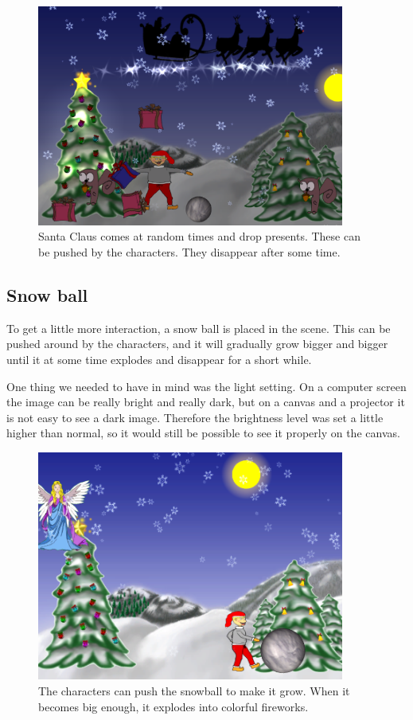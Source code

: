 \begin{figure}[htbp]
\centering
\includegraphics[width=0.90\textwidth]{Pictures/Design/santa.png}
\caption{Santa Claus comes at random times and drop presents. These can be pushed by the characters. They disappear after some time.}
\label{fig:santa}
\end{figure}

\subsection{Snow ball}
To get a little more interaction, a snow ball is placed in the scene. This can be pushed around by the characters, and it will gradually grow bigger and bigger until it at some time explodes and disappear for a short while.

One thing we needed to have in mind was the light setting. On a computer screen the image can be really bright and really dark, but on a canvas and a projector it is not easy to see a dark image. Therefore the brightness level was set a little higher than normal, so it would still be possible to see it properly on the canvas.

\begin{figure}[htbp]
\centering
\includegraphics[width=0.90\textwidth]{Pictures/Design/pushing_snowball.png}
\caption{The characters can push the snowball to make it grow. When it becomes big enough, it explodes into colorful fireworks.}
\label{fig:santa}
\end{figure}


